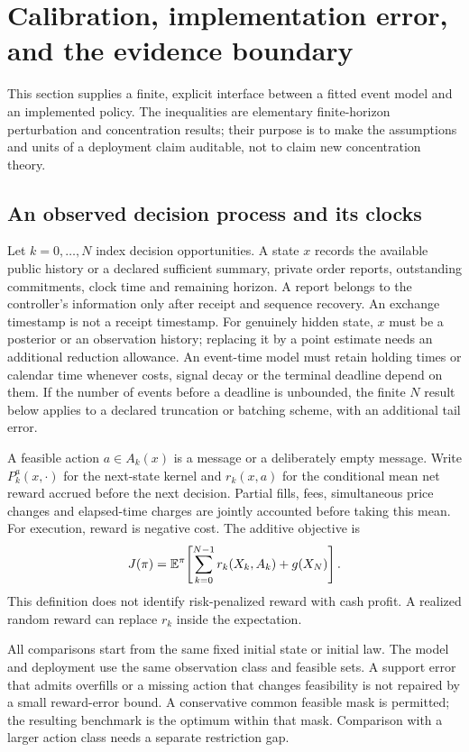 \section{Calibration, implementation error, and the evidence boundary}
\label{sec:deploymentcalibration}

This section supplies a finite, explicit interface between a fitted event model
and an implemented policy. The inequalities are elementary finite-horizon
perturbation and concentration results; their purpose is to make the
assumptions and units of a deployment claim auditable, not to claim new
concentration theory.

\subsection{An observed decision process and its clocks}

Let $k=0,\ldots,N$ index decision opportunities. A state $x$ records the
available public history or a declared sufficient summary, private order
reports, outstanding commitments, clock time and remaining horizon.
A report belongs to the controller's information only after receipt and
sequence recovery. An exchange timestamp is not a receipt timestamp.
For genuinely hidden state, $x$ must be a posterior or an observation history;
replacing it by a point estimate needs an additional reduction allowance.
An event-time model must retain holding times or calendar time whenever
costs, signal decay or the terminal deadline depend on them. If the number
of events before a deadline is unbounded, the finite $N$ result below applies
to a declared truncation or batching scheme, with an additional tail error.

A feasible action $a\in A_k(x)$ is a message or a deliberately empty message.
Write $P_k^a(x,\cdot)$ for the next-state kernel and $r_k(x,a)$ for the
conditional mean net reward accrued before the next decision. Partial fills,
fees, simultaneous price changes and elapsed-time charges are jointly
accounted before taking this mean. For execution, reward is negative cost.
The additive objective is
\[
 J(\pi)=\mathbb{E}^\pi\!\left[\sum_{k=0}^{N-1}r_k(X_k,A_k)+g(X_N)\right].
\]
This definition does not identify risk-penalized reward with cash profit.
A realized random reward can replace $r_k$ inside the expectation.

All comparisons start from the same fixed initial state or initial law.
The model and deployment use the same observation class and feasible sets.
A support error that admits overfills or a missing action that changes
feasibility is not repaired by a small reward-error bound. A conservative
common feasible mask is permitted; the resulting benchmark is the optimum
within that mask. Comparison with a larger action class needs a separate
restriction gap.

